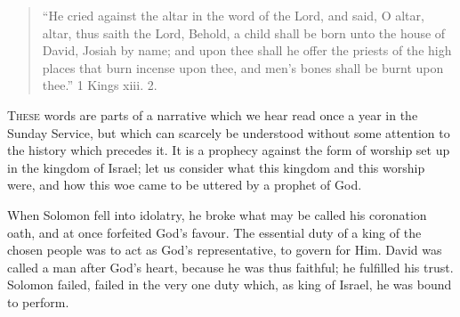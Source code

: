 
\begin{quote}

``He cried against the altar in the word of the Lord, and
said, O altar, altar, thus saith the Lord, Behold, a child shall be
born unto the house of David, Josiah by name; and upon thee shall he
offer the priests of the high places that burn incense upon thee,
and men's bones shall be burnt upon thee.'' 1 Kings xiii. 2.

\end{quote}

T\textsc{hese} words are parts of a narrative which we hear read once a year
in the Sunday Service, but which can scarcely be understood without
some attention to the history which precedes it. It is a prophecy
against the form of worship set up in the kingdom of Israel; let us
consider what this kingdom and this worship were, and how this woe
came to be uttered by a prophet of God.

When Solomon fell into idolatry, he broke what may be called his
coronation oath, and at once forfeited God's favour. The essential
duty of a king of the chosen people was to act as God's
representative, to govern for Him. David was called a man after God's
heart, because he was thus faithful; he fulfilled his trust. Solomon
failed, failed in the very one duty which, as king of Israel, he was
bound to perform.

